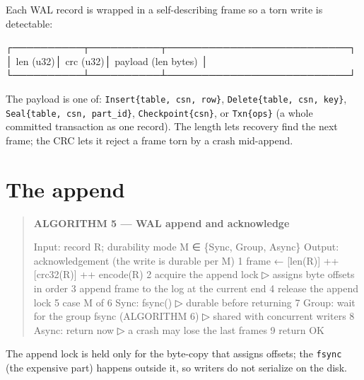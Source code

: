 \documentclass[
  11pt,
  openany]{book}
\newenvironment{Shaded}{}{}
\newcommand{\NormalTok}[1]{#1}
\begin{document}
Each WAL record is wrapped in a self-describing frame so a torn write is
detectable:

\begin{Shaded}
\begin{Highlighting}[]
\NormalTok{ ┌──────────┬──────────┬──────────────────────────┐}
\NormalTok{ │ len (u32)│ crc (u32)│ payload (len bytes)       │}
\NormalTok{ └──────────┴──────────┴──────────────────────────┘}
\end{Highlighting}
\end{Shaded}

The payload is one of: \texttt{Insert\{table,\ csn,\ row\}},
\texttt{Delete\{table,\ csn,\ key\}},
\texttt{Seal\{table,\ csn,\ part\_id\}}, \texttt{Checkpoint\{csn\}}, or
\texttt{Txn\{ops\}} (a whole committed transaction as one record). The
length lets recovery find the next frame; the CRC lets it reject a frame
torn by a crash mid-append.

\section{The append}\label{the-append}

\begin{quote}
\textbf{ALGORITHM 5 --- WAL append and acknowledge}

\begin{Shaded}
\begin{Highlighting}[]
\NormalTok{Input:  record R; durability mode M ∈ \{Sync, Group, Async\}}
\NormalTok{Output: acknowledgement (the write is durable per M)}
\NormalTok{1  frame ← [len(R)] ++ [crc32(R)] ++ encode(R)}
\NormalTok{2  acquire the append lock                          ▷ assigns byte offsets in order}
\NormalTok{3  append frame to the log at the current end}
\NormalTok{4  release the append lock}
\NormalTok{5  case M of}
\NormalTok{6    Sync:  fsync()                                 ▷ durable before returning}
\NormalTok{7    Group: wait for the group fsync (ALGORITHM 6)  ▷ shared with concurrent writers}
\NormalTok{8    Async: return now                              ▷ a crash may lose the last frames}
\NormalTok{9  return OK}
\end{Highlighting}
\end{Shaded}
\end{quote}

The append lock is held only for the byte-copy that assigns offsets; the
\texttt{fsync} (the expensive part) happens outside it, so writers do
not serialize on the disk.
\end{document}
